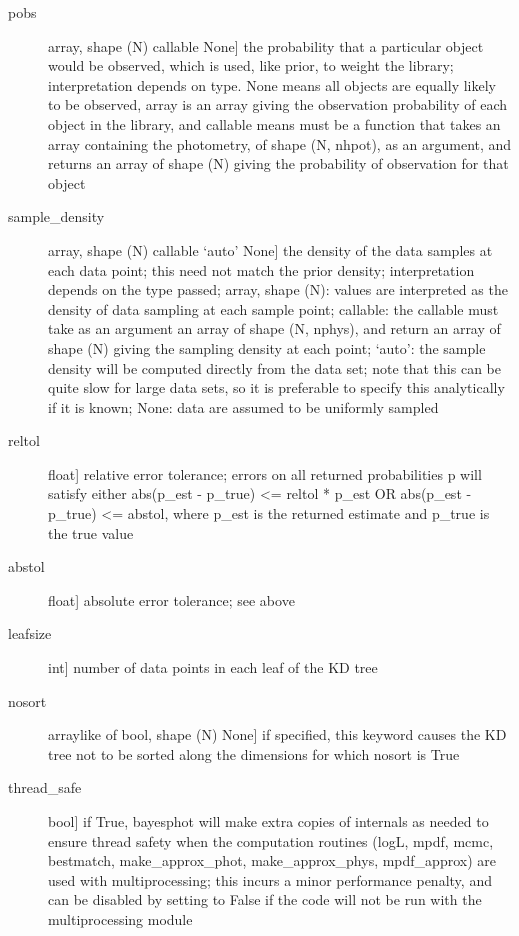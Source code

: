 \documentclass[letterpaper,10pt,english]{sphinxmanual}
\begin{document}
\begin{fulllineitems}
\begin{fulllineitems}
\begin{description}
\begin{description}
\item[{pobs}] \leavevmode{[}array, shape (N) \textbar{} callable \textbar{} None{]}
the probability that a particular object would be observed,
which is used, like prior, to weight the library;
interpretation depends on type. None means all objects are
equally likely to be observed, array is an array giving the
observation probability of each object in the library, and
callable means must be a function that takes an array
containing the photometry, of shape (N, nhpot), as an
argument, and returns an array of shape (N) giving the
probability of observation for that object

\item[{sample\_density}] \leavevmode{[}array, shape (N) \textbar{} callable \textbar{} `auto' \textbar{} None{]}
the density of the data samples at each data point; this
need not match the prior density; interpretation depends
on the type passed; array, shape (N): values are
interpreted as the density of data sampling at each
sample point; callable: the callable must take as an
argument an array of shape (N, nphys), and return an
array of shape (N) giving the sampling density at each
point; `auto': the sample density will be computed
directly from the data set; note that this can be quite
slow for large data sets, so it is preferable to specify
this analytically if it is known; None: data are assumed
to be uniformly sampled

\item[{reltol}] \leavevmode{[}float{]}
relative error tolerance; errors on all returned
probabilities p will satisfy either
abs(p\_est - p\_true) \textless{}= reltol * p\_est   OR
abs(p\_est - p\_true) \textless{}= abstol,
where p\_est is the returned estimate and p\_true is the
true value

\item[{abstol}] \leavevmode{[}float{]}
absolute error tolerance; see above

\item[{leafsize}] \leavevmode{[}int{]}
number of data points in each leaf of the KD tree

\item[{nosort}] \leavevmode{[}arraylike of bool, shape (N) \textbar{} None{]}
if specified, this keyword causes the KD tree not to be
sorted along the dimensions for which nosort is True

\item[{thread\_safe}] \leavevmode{[}bool{]}
if True, bayesphot will make extra copies of internals
as needed to ensure thread safety when the computation
routines (logL, mpdf, mcmc, bestmatch, make\_approx\_phot,
make\_approx\_phys, mpdf\_approx) are used with
multiprocessing; this incurs a minor performance
penalty, and can be disabled by setting to False if the
code will not be run with the multiprocessing module


\end{description}
\end{description}
\end{fulllineitems}
\end{fulllineitems}
\end{document}
